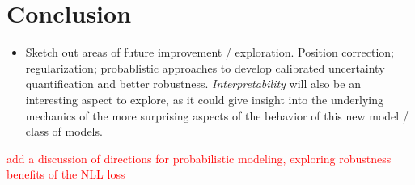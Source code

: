 \documentclass[sn-mathphys]{sn-jnl}%
\theoremstyle{thmstyleone}%
\theoremstyle{thmstyletwo}%
\theoremstyle{thmstylethree}%
\begin{document}
%
%
%


\section{Conclusion}
\begin{itemize}
\item Sketch out areas of future improvement / exploration. Position correction; regularization; probablistic approaches to develop calibrated uncertainty quantification and better robustness. \emph{Interpretability} will also be an interesting aspect to explore, as it could give insight into the underlying mechanics of the more surprising aspects of the behavior of this new model / class of models.
\end{itemize}
\textcolor{red}{add a discussion of directions for probabilistic modeling, exploring robustness benefits of the NLL loss}
\end{document}

